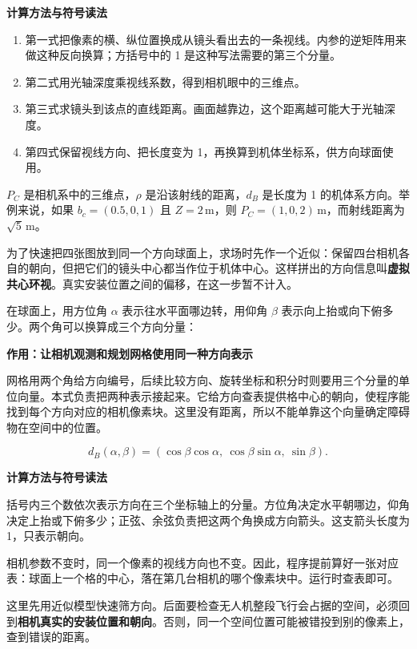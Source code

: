\documentclass[12pt,a4paper]{article}
\numberwithin{equation}{topic}
\begin{document}
\noindent\textbf{计算方法与符号读法}\par\nobreak
\begin{enumerate}
\item 第一式把像素的横、纵位置换成从镜头看出去的一条视线。内参的逆矩阵用来做这种反向换算；方括号中的 1 是这种写法需要的第三个分量。
\item 第二式用光轴深度乘视线系数，得到相机眼中的三维点。
\item 第三式求镜头到该点的直线距离。画面越靠边，这个距离越可能大于光轴深度。
\item 第四式保留视线方向、把长度变为 1，再换算到机体坐标系，供方向球面使用。
\end{enumerate}


\(P_C\) 是相机系中的三维点，\(\rho\) 是沿该射线的距离，\(d_B\) 是长度为 1 的机体系方向。举例来说，如果 \(b_c=(0.5,0,1)\) 且 \(Z=2\,\mathrm m\)，则 \(P_C=(1,0,2)\,\mathrm m\)，而射线距离为 \(\sqrt5\,\mathrm m\)。

为了快速把四张图放到同一个方向球面上，求场时先作一个近似：保留四台相机各自的朝向，但把它们的镜头中心都当作位于机体中心。这样拼出的方向信息叫\textbf{虚拟共心环视}。真实安装位置之间的偏移，在这一步暂不计入。

在球面上，用方位角 \(\alpha\) 表示往水平面哪边转，用仰角 \(\beta\) 表示向上抬或向下俯多少。两个角可以换算成三个方向分量：

\noindent\textbf{作用：让相机观测和规划网格使用同一种方向表示}\par\nobreak
网格用两个角给方向编号，后续比较方向、旋转坐标和积分时则要用三个分量的单位向量。本式负责把两种表示接起来。它给方向查表提供格中心的朝向，使程序能找到每个方向对应的相机像素块。这里没有距离，所以不能单靠这个向量确定障碍物在空间中的位置。

\begin{equation}
\label{eq:sphere}
d_B(\alpha,\beta)=
(\cos\beta\cos\alpha,\ \cos\beta\sin\alpha,\ \sin\beta).
\end{equation}

\noindent\textbf{计算方法与符号读法}\par\nobreak
括号内三个数依次表示方向在三个坐标轴上的分量。方位角决定水平朝哪边，仰角决定上抬或下俯多少；正弦、余弦负责把这两个角换成方向箭头。这支箭头长度为 1，只表示朝向。


相机参数不变时，同一个像素的视线方向也不变。因此，程序提前算好一张对应表：球面上一个格的中心，落在第几台相机的哪个像素块中。运行时查表即可。

这里先用近似模型快速筛方向。后面要检查无人机整段飞行会占据的空间，必须回到\textbf{相机真实的安装位置和朝向}。否则，同一个空间位置可能被错投到别的像素上，查到错误的距离。
\end{document}
